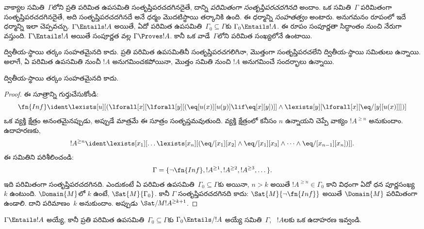 \documentclass[../../../include/open-logic-section]{subfiles}
\begin{document}


\begin{explain}
వాక్యాల సమితి~$\Gamma$లోని ప్రతి పరిమిత ఉపసమితి
సంతృప్తిపరచదగినదైతే, దాన్ని \emph{పరిమితంగా సంతృప్తిపరచదగినది}
అందాం. ఒక  సమితి~$\Gamma$ పరిమితంగా
సంతృప్తిపరచదగినదైతే, అది సంతృప్తిపరచదగినదే అనే ధర్మం మొదటిస్థాయి
తర్కానికి ఉంది. ఈ ధర్మాన్ని \emph{సంహతత్వం} అంటారు. అనుగమనం రూపంలో
ఇదే ధర్మాన్ని ఇలా చెప్పవచ్చు. $\Gamma \Entails !A$ అయితే, ఏదో పరిమిత
ఉపసమితి~$\Gamma_0 \subseteq \Gamma$కు $\Gamma_0 \Entails !A$.
ఈ రూపం సంపూర్ణతా సిద్ధాంతం నుంచి నేరుగా వస్తుంది.
$\Gamma \Entails !A$ అయితే సంపూర్ణత వల్ల $\Gamma \Proves !A$.
కానీ ఒక  వాడే~$\Gamma$లోని 
పరిమిత సంఖ్యలోనే ఉంటాయి.

ద్వితీయ-స్థాయి తర్కం సంహతమైనది కాదు. ప్రతి పరిమిత ఉపసమితినీ
సంతృప్తిపరచగలిగినా, మొత్తంగా సంతృప్తిపరచలేని ద్వితీయ-స్థాయి
 సమితులు ఉన్నాయి. అలాగే, ఏ పరిమిత ఉపసమితి నుంచీ
$!A$ అనుగమించకపోయినా, మొత్తం సమితి నుంచి $!A$ అనుగమించే సందర్భాలు ఉన్నాయి.
\end{explain}


\begin{thm}
ద్వితీయ-స్థాయి తర్కం సంహతమైనది కాదు.
\end{thm}

\begin{proof}
ఈ సూత్రాన్ని గుర్తుచేసుకోండి:
\[
\fn{Inf} \ident \lexists[u][(\lforall[x][\lforall[y][(\eq[u(x)][u(y)]
      \lif \eq[x][y])]] \land \lexists[y][\lforall[x][\eq/[y][u(x)]]])]
\]
ఒక  వ్యక్తి క్షేత్రం అనంతమైనప్పుడు, అప్పుడే మాత్రమే ఈ సూత్రం
సంతృప్తమవుతుంది. వ్యక్తి క్షేత్రంలో కనీసం $n$  ఉన్నాయని
చెప్పే వాక్యం $!A^{\ge n}$ అనుకుందాం. ఉదాహరణకు,
\[
!A^{\ge n} \ident \lexists[x_1][\dots\lexists[x_n][(\eq/[x_1][x_2]
    \land \eq/[x_1][x_3] \land \dots \land \eq/[x_{n-1}][x_n])]].
\]
ఈ  సమితిని పరిశీలించండి:
\[
\Gamma = \{\lnot \fn{Inf}, !A^{\ge 1}, !A^{\ge 2}, !A^{\ge 3}, \dots\}.
\]
ఇది పరిమితంగా సంతృప్తిపరచదగినది. ఎందుకంటే ఏ పరిమిత ఉపసమితి~$\Gamma_0
\subseteq \Gamma$కు అయినా, $n>k$ అయితే $!A^{\ge n} \in \Gamma_0$
కాని విధంగా ఏదో ధన పూర్ణసంఖ్య~$k$ ఉంటుంది. $\Domain{M}$లో $k$
 ఉంటే, $\Sat{M}{\Gamma_0}$. కానీ $\Gamma$
సంతృప్తిపరచదగినది కాదు: $\Sat{M}{\lnot \fn{Inf}}$ అయితే
$\Domain{M}$ పరిమితంగా ఉండాలి. దాని పరిమాణం~$k$ అనుకుందాం. అప్పుడు
$\Sat/{M}{!A^{\ge k+1}}$.
\end{proof}

\begin{prob}
$\Gamma \Entails !A$ అయ్యే, కానీ ప్రతి పరిమిత ఉపసమితి~$\Gamma_0
\subseteq \Gamma$కు $\Gamma_0 \Entails/ !A$ అయ్యే సమితి~$\Gamma$,
~$!A$లకు ఒక ఉదాహరణ ఇవ్వండి.
\end{prob}
\end{document}
